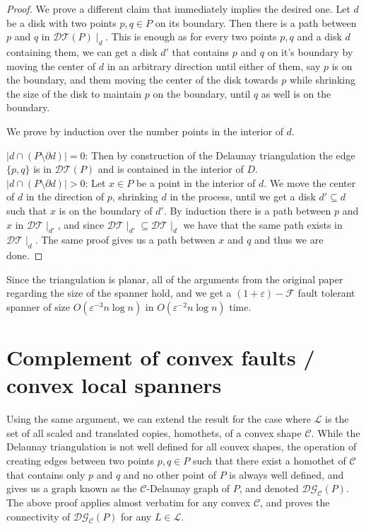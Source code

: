 \documentclass{article}
\newcommand{\eps}{\varepsilon}
\newcommand{\C}{\mathcal{C}}
\newcommand{\FF}{\mathcal{F}}
\newcommand{\LL}{\mathcal{L}}
\newcommand{\DT}{\mathcal{DT}}
\newcommand{\DG}{\mathcal{DG}}
\begin{document}
	\begin{proof}
		We prove a different claim that immediately implies the desired one. Let $d$ be a disk with two points $p,q\in P$ on its boundary. Then there is a path between $p$ and $q$ in $\DT(P)\mid_d$. This is enough as for every two points $p,q$ and a disk $d$ containing them, we can get a disk $d'$ that contains $p$ and $q$ on it's boundary by moving the center of $d$ in an arbitrary direction until either of them, say $p$ is on the boundary, and them moving the center of the disk towards $p$ while shrinking the size of the disk to maintain $p$ on the boundary, until $q$ as well is on the boundary.  
		
		We prove by induction over the number points in the interior of $d$.
		
		$|d\cap (P\setminus \partial d)| = 0$: Then by construction of the Delaunay triangulation the edge $\{p,q\}$ is in $\DT(P)$ and is contained in the interior of $D$.\\
		
		$|d\cap (P\setminus \partial d)| > 0$: Let $x\in P$ be a point in the interior of $d$. We move the center of $d$ in the direction of $p$, shrinking $d$ in the process, until we get a disk $d'\subseteq d$ such that $x$ is on the boundary of $d'$. By induction there is a path between $p$ and $x$ in $\DT\mid_{d'}$, and since $\DT\mid_{d'}\subseteq \DT\mid_{d}$ we have that the same path exists in $\DT\mid_{d}$. The same proof gives us a path between $x$ and $q$ and thus we are done.
		
	\end{proof}

	Since the triangulation is planar, all of the arguments from the original paper regarding the size of the spanner hold, and we get a $(1+\eps)-\FF$ fault tolerant spanner of size $O(\eps^{-3}n\log n)$ in $O(\eps^{-2}n\log n)$ time.
	
	\section{Complement of convex faults / convex  local spanners}
	Using the same argument, we can extend the result for the case where $\LL$ is the set of all scaled and translated copies, homothets, of a convex shape $\C$. While the Delaunay triangulation is not well defined for all convex shapes, the operation of creating edges between two points $p,q\in P$ such that there exist a homothet of $\C$ that contains only $p$ and $q$ and no other point of $P$ is always well defined, and gives us a graph known as the $\C$-Delaunay graph of $P$, and denoted $\DG_{\C}(P)$. The above proof applies almost verbatim for any convex $\C$, and proves the connectivity of $\DG_{\C}(P)$ for any $L\in \LL$.
	
\end{document}
